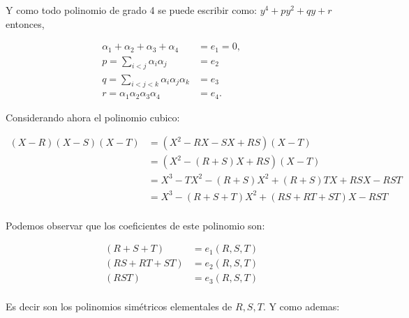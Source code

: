 \begin{solution}
  Y como todo polinomio de grado 4 se puede escribir como: $y^4 + p y^2 + q y + r$ entonces,
  
  \begin{align*}
  \alpha_{1}+\alpha_{2}+\alpha_{3}+\alpha_{4} &= e_{1}=0, \qquad \text{}\\
  p= \sum_{i<j}\alpha_{i}\alpha_{j} &= e_{2}\\
  q= \sum_{i<j<k}\alpha_{i}\alpha_{j}\alpha_{k} &= e_{3}\\
  r= \alpha_{1}\alpha_{2}\alpha_{3}\alpha_{4} &= e_{4}.
  \end{align*}

  
  Considerando ahora el polinomio cubico:

  \begin{align*}
    (X-R)(X-S)(X-T) &= (X^2 - RX - SX + RS)(X-T)\\
    &= (X^2 - (R+S)X + RS)(X-T)\\
    &= X^3 - TX^2 - (R+S)X^2 + (R+S)TX + RSX - RST\\
    &= X^3 - (R+S+T)X^2 + (RS+RT+ST)X - RST\\
  \end{align*}

  Podemos observar que los coeficientes de este polinomio son:

  \begin{align*}
    (R+S+T) &= e_{1}(R,S,T)\\
    (RS+RT+ST) &= e_{2}(R,S,T)\\
    (RST) &= e_{3}(R,S,T)\\
  \end{align*}

  Es decir son los polinomios simétricos elementales de $R,S,T$. Y como ademas:


\end{solution}
